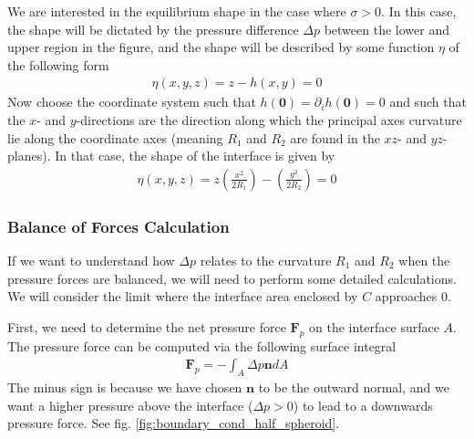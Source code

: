 \documentclass[a4paper, 12pt]{article}
\numberwithin{equation}{subsubsection}
\begin{document}
We are interested in the equilibrium shape in the case where $\sigma > 0$. In this case, the shape will be dictated by the pressure difference $\Delta p$ between the lower and upper region in the figure, and the shape will be described by some function $\eta$ of the following form
\begin{align}
	\eta(x, y, z) = z - h(x, y) = 0
\end{align}
Now choose the coordinate system such that $h(\mathbf{0}) = \partial_i h (\mathbf{0}) = 0$ and such that the $x$- and $y$-directions are the direction along which the principal axes curvature lie along the coordinate axes (meaning $R_1$ and $R_2$ are found in the $xz$- and $yz$-planes). In that case, the shape of the interface is given by
\begin{align}
	\eta(x, y, z) = z \left( \frac{x^2}{2R_1} \right) - \left( \frac{y^2}{2R_2} \right) = 0
\end{align}

\subsubsection{Balance of Forces Calculation}
If we want to understand how $\Delta p$ relates to the curvature $R_1$ and $R_2$ when the pressure forces are balanced, we will need to perform some detailed calculations. We will consider the limit where the interface area enclosed by $C$ approaches 0.

First, we need to determine the net pressure force $\mathbf{F}_p$ on the interface surface $A$. The pressure force can be computed via the following surface integral
\begin{align}
	\mathbf{F}_p = - \int_A \Delta p \mathbf{n} dA
\end{align}
The minus sign is because we have chosen $\mathbf{n}$ to be the outward normal, and we want a higher pressure above the interface ($\Delta p > 0$) to lead to a downwards pressure force. See fig. \ref{fig:boundary_cond_half_spheroid}. 
\end{document}

